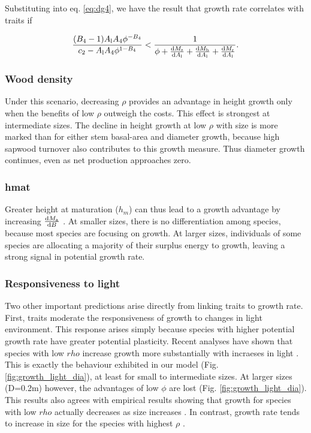 \documentclass[a4paper,11pt]{article}
\begin{document}
Substituting into eq. \ref{eq:dg4}, we have the result that growth rate correlates
with traits if

\begin{equation} \label{eq:G6}
\frac{(B_4-1) A_{\rm l} A_4\phi ^{-B_4}}{c_2 - A_{\rm l} A_4 \phi ^{1-B_4}}
< \frac{1}{\phi
 + \frac{{\rm d}M_{\rm s}}{{\rm d}A_{\rm l}} + \frac{{\rm d}M_\textrm
 {b}}{{\rm d}A_{\rm l}} + \frac{{\rm d}M_{\rm r}}{{\rm d}A_{\rm l}}}.
\end{equation}

\subsubsection{Wood density}

Under this scenario, decreasing $\rho$ provides an advantage in height
growth only when the benefits of low $\rho$ outweigh the costs. This
effect is strongest at intermediate sizes. The decline in height growth
at low $\rho$ with size is more marked than for either stem basal-area
and diameter growth, because high sapwood turnover also contributes to
this growth measure. Thus diameter growth continues, even as net
production approaches zero.

\subsubsection{hmat}

 Greater height at maturation ($h_m$)
can thus lead to a growth advantage by increasing
$\frac{{\rm d}M_{\rm a}}{{\rm d}B}$ . At smaller sizes, there is no differentiation
among species, because most species are focusing on growth. At larger sizes, individuals of some species are
allocating a majority of their surplus energy to growth, leaving a
strong signal in potential growth rate.

\subsubsection{Responsiveness to light}

Two other important predictions arise directly from linking traits to
growth rate. First, traits moderate the
responsiveness of growth to changes in light environment. This response
arises simply because species with higher potential growth rate have
greater potential plasticity. Recent analyses have shown that species
with low $rho$ increase growth more substantially with incraeses in
light \citep{Ruger-2012}. This is exactly the behaviour
exhibited in our model (Fig. \ref{fig:growth_light_dia}), at least for small
to intermediate sizes. At larger sizes (D=0.2m) however, the advantages
of low $\phi$ are lost (Fig. \ref{fig:growth_light_dia}). This results also
agrees with empirical results showing that growth for species with low
$rho$ actually decreases as size
increases \citep{Ruger-2012}. In contrast, growth rate tends
to increase in size for the species with highest
$\rho$ \citep{Ruger-2012}.
\end{document}
